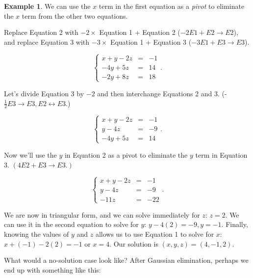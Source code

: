 \documentclass[
]{book}
\theoremstyle{definition}
\theoremstyle{definition}
\newtheorem{example}{Example}[chapter]
\theoremstyle{definition}
\theoremstyle{definition}
\theoremstyle{remark}
\begin{document}
\begin{examplebox}
\begin{example}
We can use the \(x\) term in the first equation as a \emph{pivot} to eliminate the \(x\) term from the other two equations.

Replace Equation 2 with \(-2\times\) Equation 1 + Equation 2 (\(-2E1+E2\to E2\)), and replace Equation 3 with \(-3\times\) Equation 1 + Equation 3 (\(-3E1+E3\to E3\)).

\begin{equation*}
    \left\{
    \begin{array}{rcl}
    x+y-2z&=&-1\\
    -4y+5z&=&14\\
    -2y+8z&=&18 
    \end{array} \right. .
\end{equation*}

Let's divide Equation 3 by \(-2\) and then interchange Equations 2 and 3. (-\(\frac{1}{2}E3\to E3,E2\leftrightarrow E3\).)

\begin{equation*}
    \left\{
    \begin{array}{rcl}
    x+y-2z&=&-1\\
    y-4z&=&-9\\ 
    -4y+5z&=&14
    \end{array} \right. .
\end{equation*}

Now we'll use the \(y\) in Equation 2 as a pivot to eliminate the \(y\) term in Equation 3. \((4E2+E3\to E3.)\)

\begin{equation*}
    \left\{
    \begin{array}{rcl}
    x+y-2z&=&-1\\
    y-4z&=&-9\\ 
    -11z&=&-22
    \end{array} \right. .
\end{equation*}

We are now in triangular form, and we can solve immediately for \(z\): \(z=2\). We can use it in the second equation to solve for \(y\): \(y-4(2)=-9, y=-1\). Finally, knowing the values of \(y\) and \(z\) allows us to use Equation 1 to solve for \(x\): \(x+(-1)-2(2)=-1\) or \(x=4.\) Our solution is \((x,y,z)=(4,-1,2)\).
\end{example}

\end{examplebox}

What would a no-solution case look like? After Gaussian elimination, perhaps we end up with something like this:
\end{document}

